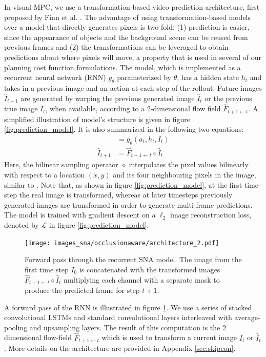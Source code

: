 In visual MPC, we use a transformation-based video prediction architecture, first proposed by Finn et al. \cite{finn_nips}. The advantage of using transformation-based models over a model that directly generates pixels is two-fold: (1) prediction is easier, since the appearance of objects and the background scene can be reused from previous frames and (2) the transformations can be leveraged to obtain predictions about where pixels will move, a property that is used in several of our planning cost function formulations. The model, which is implemented as a recurrent neural network (RNN) $g_{\theta}$ parameterized by $\theta$, has a hidden state $h_t$ and takes in a previous image and an action at each step of the rollout.  Future images $\hat{I}_{t+1}$ are generated by warping the previous generated image $\hat{I}_t$ or the previous true image $I_t$, when available, according to a 2-dimensional flow field $\hat{F}_{t+1 \leftarrow t}$. A simplified illustration of model's structure is given in figure \ref{fig:prediction_model}. It is also summarized in the following two equations:
\begin{align}
[h_{t+1}, \hat{F}_{t+1 \leftarrow t}] 	&= g_{\theta}(a_t, h_t, I_t) \\
\hat{I}_{t+1} 							&= \hat{F}_{t+1 \leftarrow t} \diamond  \hat{I}_t 
\label{simple_dna}
\end{align}
Here, the bilinear sampling operator $\diamond$ interpolates the pixel values bilinearly with respect to a location $(x,y)$ and its four neighbouring pixels in the image, similar to \cite{zhou2016view}. Note that, as shown in figure \ref{fig:prediction_model}, at the first time-step the real image is transformed, whereas at later timesteps previously generated images are transformed in order to generate multi-frame predictions. The model is trained with gradient descent on a $\ell_2$ image reconstruction loss, denoted by $\mathcal{L}$ in figure \ref{fig:prediction_model}.
\begin{figure}[t]
    \centering
    \texttt{[image: images\_sna/occlusionaware/architecture\_2.pdf]}
    \caption{\small{Forward pass through the recurrent SNA model. The image from the first time step $I_0$ is concatenated with the transformed images $\hat{F}_{t+1 \leftarrow t} \diamond  \hat{I}_t $ multiplying each channel with a separate mask to produce the predicted frame for step $t+1$.}}      \label{fig:occlusion_model}
\end{figure}
A forward pass of the RNN is illustrated in figure \ref{fig:occlusion_model}. We use a series of stacked convolutional LSTMs and standard convolutional layers interleaved with average-pooling and upsampling layers. The result of this computation is the 2 dimensional flow-field $\hat{F}_{t+1 \leftarrow t}$ which is used to transform a current image $I_t$ or $\hat{I}_t$. More details on the architecture are provided in Appendix \ref{sec:skipcon}.

